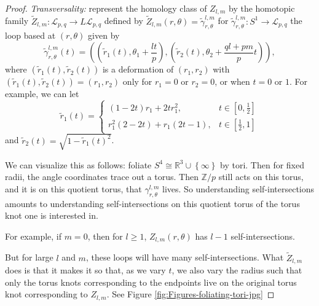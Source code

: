 \documentclass[reqno]{amsart}
\theoremstyle{definition}
\theoremstyle{remark}
\begin{document}
\begin{proof}
    \textit{Transversality:} represent the homology
    class of $Z_{l,m}$ by the homotopic family
    $\tilde{Z}_{l,m} \colon \mathcal{L}_{p,q} \to 
    L \mathcal{L}_{p,q}$ defined by
    $\tilde{Z}_{l,m}(r, \theta) = 
    \tilde{\gamma}_{r,\theta}^{l,m}$ for
    $\tilde{\gamma}_{r, \theta}^{l,m} \colon S^{1} \to 
    \mathcal{L}_{p,q}$  the loop based at 
    $(r , \theta)$ given by
    \[
    \tilde{\gamma}_{r, \theta}^{l,m} (t) = 
    \left( \left( \tilde{r}_{1}(t), \theta_1 + 
    \frac{lt}{p} \right), 
    \left( \tilde{r}_{2}(t), \theta_2 + \frac{ql+pm}{p}t \right) 
\right), 
    \] 
    where $\left( \tilde{r}_1(t), \tilde{r}_2(t) \right) $ is a
    deformation of $\left( r_1,r_2 \right) $ with
    $\left( \tilde{r}_1 (t) , \tilde{r}_2(t) \right) =
    \left( r_1,r_2 \right) $ only for $r_1 = 0$ or
    $r_2 = 0$, or when $t = 0$ or $1$.
    For example, 
    we can let
    \[
    \tilde{r}_1(t) = 
    \begin{cases}
        (1-2t) r_1 + 2t r_1^2,& t \in \left[ 0,\frac{1}{2} \right] \\
        r_1^2 (2-2t) + r_1 (2t-1),& t \in \left[ \frac{1}{2},1 \right] 
    \end{cases}
    \] 
    and $\tilde{r}_2(t) = 
    \sqrt{1 - \tilde{r}_1(t)^2} $.\\
    \linebreak

    We can visualize this as follows: 
    foliate $S^{4} \cong \mathbb{R}^3 \cup \left\{ \infty \right\} $ 
    by tori. Then for fixed radii, the
    angle coordinates trace out a torus.
    Then $\mathbb{Z}/p$ still acts on this torus, and 
    it is on this quotient torus, that
    $\gamma_{r, \theta}^{l,m}$ lives.
    So understanding self-intersections amounts to
    understanding self-intersections on this quotient torus of the
    torus knot one is interested in.

    For example, if
    $m = 0$, then for $l\ge 1$,
    $Z_{l,m}\left( r , \theta \right) $ has
    $l-1$ self-intersections.

    But for large $l$ and $m$, these loops will have many self-intersections.
    What $\tilde{Z}_{l,m}$ does is that
    it makes it so that, as we vary $t$, we also vary
    the radius such that only the torus knots
    corresponding to the endpoints
    live on the original torus knot corresponding to
    $Z_{l,m}$. See Figure \ref{fig:Figures-foliating-tori-jpg}



\end{proof}
\end{document}
